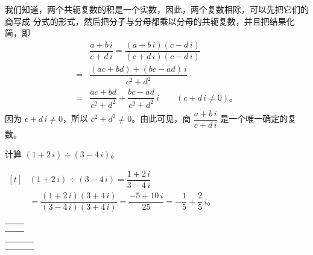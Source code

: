 我们知道，两个共轭复数的积是一个实数，因此，两个复数相除，可以先把它们的商写成
分式的形式，然后把分子与分母都乘以分母的共轭复数，并且把结果化简，即
\begin{align*}
        & \dfrac{a + b\,i}{c + d\,i} = \dfrac{(a + b\,i)(c - d\,i)}{(c + d\,i)(c - d\,i)} \\
    ={} & \dfrac{(ac + bd) + (bc - ad)\,i}{c^2 + d^2} \\
    ={} & \dfrac{ac + bd}{c^2 + d^2} + \dfrac{bc - ad}{c^2 + d^2}\,i \qquad (c + d\,i \neq 0) \text{。}
\end{align*}
因为 $c + d\,i \neq 0$，所以 $c^2 + d^2 \neq 0$。由此可见，商 $\dfrac{a + b\,i}{c + d\,i}$ 是一个唯一确定的复数。


\liti 计算 $(1 + 2\,i) \div (3 - 4\,i)$。

\jie \quad $\begin{aligned}[t]
    & (1 + 2\,i) \div (3 - 4\,i) = \dfrac{1 + 2\,i}{3 - 4\,i} \\
    & = \dfrac{(1 + 2\,i)(3 + 4\,i)}{(3 - 4\,i)(3 + 4\,i)} = \dfrac{-5 + 10\,i}{25} = -\dfrac{1}{5} + \dfrac{2}{5}\,i \text{。}
\end{aligned}$



\lianxi
\begin{xiaotis}




\begin{xiaoxiaotis}

    \renewcommand\arraystretch{1.2}
    \begin{tabular}[t]{*{2}{@{}p{16em}}}
         &  \\
         & 
    \end{tabular}

\end{xiaoxiaotis}




\begin{xiaoxiaotis}

    \renewcommand\arraystretch{1.2}
    \begin{tabular}[t]{*{3}{@{}p{11em}}}
         &  &  \\[1em]
         &  & 
    \end{tabular}

\end{xiaoxiaotis}


\end{xiaotis}